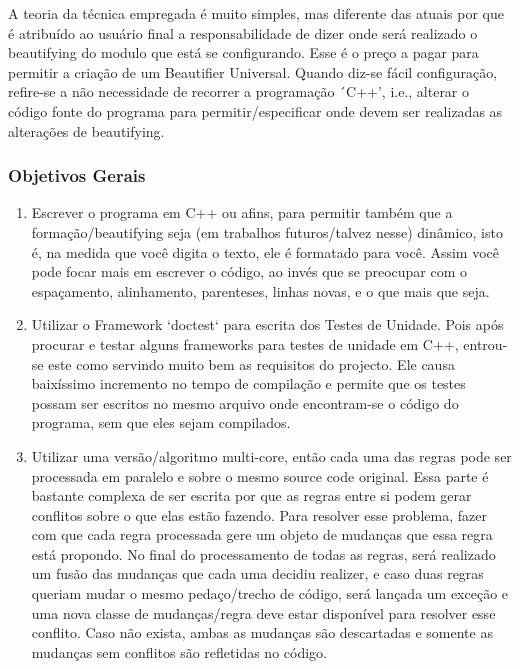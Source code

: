 {    A teoria da técnica empregada é muito simples, mas diferente das atuais por que é atribuído ao
    usuário final a responsabilidade de dizer onde será realizado o beautifying do modulo que está
    se configurando. Esse é o preço a pagar para permitir a criação de um Beautifier Universal.
    Quando diz-se fácil configuração, refire-se a não necessidade de recorrer a programação ´C++',
    i.e., alterar o código fonte do programa para permitir/especificar onde devem ser realizadas as
    alterações de beautifying.


\subsubsection{Objetivos Gerais}

    \begin{enumerate}[leftmargin=*]

        \item

        Escrever o programa em C++ ou afins, para permitir também que a formação/beautifying seja
        (em trabalhos futuros/talvez nesse) dinâmico, isto é, na medida que você digita o texto, ele
        é formatado para você. Assim você pode focar mais em escrever o código, ao invés que se
        preocupar com o espaçamento, alinhamento, parenteses, linhas novas, e o que mais que seja.

        \item

        Utilizar o Framework `doctest` para escrita dos Testes de Unidade. Pois após procurar e
        testar alguns frameworks para testes de unidade em C++, entrou-se este como servindo muito
        bem as requisitos do projecto. Ele causa baixíssimo incremento no tempo de compilação e
        permite que os testes possam ser escritos no mesmo arquivo onde encontram-se o código do
        programa, sem que eles sejam compilados.

        \item

        Utilizar uma versão/algoritmo multi-core, então cada uma das regras pode ser processada em
        paralelo e sobre o mesmo source code original. Essa parte é bastante complexa de ser escrita
        por que as regras entre si podem gerar conflitos sobre o que elas estão fazendo. Para
        resolver esse problema, fazer com que cada regra processada gere um objeto de mudanças que
        essa regra está propondo. No final do processamento de todas as regras, será realizado um
        fusão das mudanças que cada uma decidiu realizer, e caso duas regras queriam mudar o mesmo
        pedaço/trecho de código, será lançada um exceção e uma nova classe de mudanças/regra deve
        estar disponível para resolver esse conflito. Caso não exista, ambas as mudanças são
        descartadas e somente as mudanças sem conflitos são refletidas no código.


\end{enumerate}}
